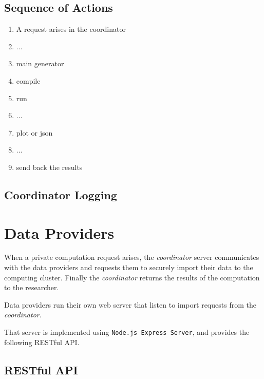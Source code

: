 \subsection{Sequence of Actions}\label{ss:coordinator-sequence}


\begin{enumerate}
\item A request arises in the coordinator
\item ...
\item main generator
\item compile
\item run
\item ...
\item plot or json
\item ...
\item send back the results
\end{enumerate}


\subsection{Coordinator Logging}\label{ss:coordinator-logging}




\section{Data Providers}\label{s:impl-data-providers}
When a private computation request arises, the \textit{coordinator} server communicates with the data providers and requests them to securely import their data to the computing cluster.
Finally the \textit{coordinator} returns the results of the computation to the researcher.

Data providers run their own web server that listen to import requests from the \textit{coordinator}.

That server is implemented using \texttt{Node.js Express Server}, and provides the following RESTful API.



\subsection{RESTful API}\label{ss:data-providers-restful-api}


